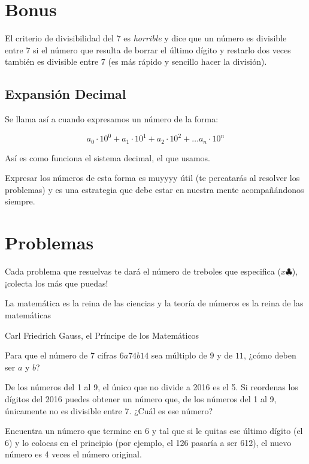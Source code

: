 \section{Bonus}

El criterio de divisibilidad del 7 es \textit{horrible} y dice 
que un número es divisible entre 7 si el número que resulta de 
borrar el último dígito y restarlo dos veces también es 
divisible entre 7 (es más rápido y sencillo hacer la división).

\subsection{Expansión Decimal}

Se llama así a cuando expresamos un número de la forma:

\[
a_0\cdot 10^0 + a_1\cdot 10^1+a_2\cdot 10^2+\dots a_n\cdot 10^n
\]

Así es como funciona el sistema decimal, el que usamos.

Expresar los números de esta forma es muyyyy útil (te percatarás 
al resolver los problemas) y es una estrategia que debe estar 
en nuestra mente acompañándonos siempre.

\newpage

\section{Problemas}

Cada problema que resuelvas te dará el número de treboles 
que especifica ($x \clubsuit$), ¡colecta los más que puedas!

\epigraph{La matemática es la reina de las ciencias y la teoría de 
números es la reina de las matemáticas}{Carl Friedrich Gauss, el 
Príncipe de los Matemáticos}

\begin{problem}[$2 \clubsuit$]
    Para que el número de $7$ cifras $6a74b14$ sea múltiplo de 
    $9$ y de $11$, ¿cómo deben ser $a$ y $b$? 
\end{problem}

\begin{problem}[$2 \clubsuit$]
    De los números del 1 al 9, el único que no divide a 2016 
    es el 5. Si reordenas los dígitos del 2016 puedes
    obtener un número que, de los números del 1 al 9, únicamente 
    no es divisible entre 7. ¿Cuál es ese número?
\end{problem}

\begin{problem}[$3 \clubsuit$]
    Encuentra un número que termine en 6 y tal que si le 
    quitas ese último dígito (el 6) y lo colocas en el 
    principio (por ejemplo, el 126 pasaría a ser 612), el 
    nuevo número es 4 veces el número original.
\end{problem}


